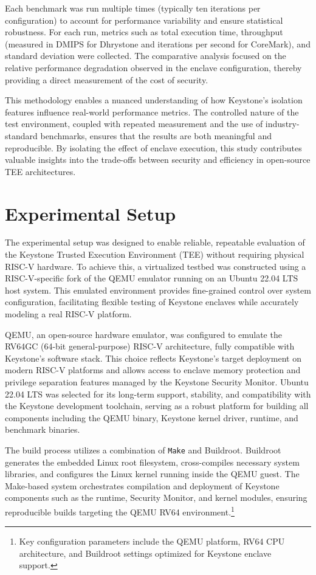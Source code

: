 Each benchmark was run multiple times (typically ten iterations per configuration) to account for performance variability and ensure statistical robustness. For each run, metrics such as total execution time, throughput (measured in DMIPS for Dhrystone and iterations per second for CoreMark), and standard deviation were collected. The comparative analysis focused on the relative performance degradation observed in the enclave configuration, thereby providing a direct measurement of the cost of security.

This methodology enables a nuanced understanding of how Keystone’s isolation features influence real-world performance metrics. The controlled nature of the test environment, coupled with repeated measurement and the use of industry-standard benchmarks, ensures that the results are both meaningful and reproducible. By isolating the effect of enclave execution, this study contributes valuable insights into the trade-offs between security and efficiency in open-source TEE architectures.

\section{Experimental Setup}
\label{sec:experimental-setup}

The experimental setup was designed to enable reliable, repeatable evaluation of the Keystone Trusted Execution Environment (TEE) without requiring physical RISC-V hardware. To achieve this, a virtualized testbed was constructed using a RISC-V-specific fork of the QEMU emulator running on an Ubuntu 22.04 LTS host system. This emulated environment provides fine-grained control over system configuration, facilitating flexible testing of Keystone enclaves while accurately modeling a real RISC-V platform.

QEMU, an open-source hardware emulator, was configured to emulate the RV64GC (64-bit general-purpose) RISC-V architecture, fully compatible with Keystone’s software stack. This choice reflects Keystone’s target deployment on modern RISC-V platforms and allows access to enclave memory protection and privilege separation features managed by the Keystone Security Monitor. Ubuntu 22.04 LTS was selected for its long-term support, stability, and compatibility with the Keystone development toolchain, serving as a robust platform for building all components including the QEMU binary, Keystone kernel driver, runtime, and benchmark binaries.

The build process utilizes a combination of \texttt{Make} and Buildroot. Buildroot generates the embedded Linux root filesystem, cross-compiles necessary system libraries, and configures the Linux kernel running inside the QEMU guest. The Make-based system orchestrates compilation and deployment of Keystone components such as the runtime, Security Monitor, and kernel modules, ensuring reproducible builds targeting the QEMU RV64 environment.\footnote{Key configuration parameters include the QEMU platform, RV64 CPU architecture, and Buildroot settings optimized for Keystone enclave support.} 

